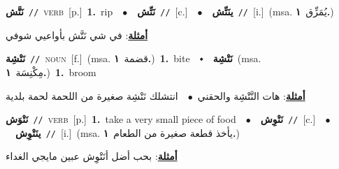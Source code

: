 \documentclass[10pt,a4paper,twoside]{article} %
\begin{document}
\begin{multicols}{2}
{\setlength\topsep{0pt}\textbf{\foreignlanguage{arabic}{نَتَّش}}\ {\color{gray}\texttt{//}\color{black}}\ \textsc{verb}\ [p.]\ \textbf{1.}~rip\ \ $\bullet$\ \ \setlength\topsep{0pt}\textbf{\foreignlanguage{arabic}{نَتِّش}}\ {\color{gray}\texttt{//}\color{black}}\ [c.]\ \ $\bullet$\ \ \setlength\topsep{0pt}\textbf{\foreignlanguage{arabic}{ينَتِّش}}\ {\color{gray}\texttt{//}\color{black}}\ [i.]\ \color{gray}(msa. \foreignlanguage{arabic}{يُمَزِّق}~\foreignlanguage{arabic}{\textbf{١.}})\color{black}\  \begin{flushright}\color{gray}\foreignlanguage{arabic}{\textbf{\underline{\foreignlanguage{arabic}{أمثلة}}}: في شي نَتَّش بأواعيي شوفي}\end{flushright}\color{black}} \vspace{2mm}

{\setlength\topsep{0pt}\textbf{\foreignlanguage{arabic}{نَتْشِة}}\ {\color{gray}\texttt{//}\color{black}}\ \textsc{noun}\ [f.]\ \color{gray}(msa. \foreignlanguage{arabic}{قضمة}~\foreignlanguage{arabic}{\textbf{١.}})\color{black}\ \textbf{1.}~bite\ \ $\smblkdiamond$\ \ \setlength\topsep{0pt}\textbf{\foreignlanguage{arabic}{نَتْشِة}}\ \color{gray}(msa. \foreignlanguage{arabic}{مِكْنِسَة}~\foreignlanguage{arabic}{\textbf{١.}})\color{black}\ \textbf{1.}~broom\  \begin{flushright}\color{gray}\foreignlanguage{arabic}{\textbf{\underline{\foreignlanguage{arabic}{أمثلة}}}: هات النَّتْشِة والحقني\ $\bullet$\ \  انتشلك نَتْشِة صغيرة من اللحمة لحمة بلدية}\end{flushright}\color{black}} \vspace{2mm}

{\setlength\topsep{0pt}\textbf{\foreignlanguage{arabic}{نَتْوَش}}\ {\color{gray}\texttt{//}\color{black}}\ \textsc{verb}\ [p.]\ \textbf{1.}~take a very small piece of food\ \ $\bullet$\ \ \setlength\topsep{0pt}\textbf{\foreignlanguage{arabic}{نَتْوِش}}\ {\color{gray}\texttt{//}\color{black}}\ [c.]\ \ $\bullet$\ \ \setlength\topsep{0pt}\textbf{\foreignlanguage{arabic}{ينَتْوِش}}\ {\color{gray}\texttt{//}\color{black}}\ [i.]\ \color{gray}(msa. \foreignlanguage{arabic}{يأخذ قطعة صغيرة من الطعام}~\foreignlanguage{arabic}{\textbf{١.}})\color{black}\  \begin{flushright}\color{gray}\foreignlanguage{arabic}{\textbf{\underline{\foreignlanguage{arabic}{أمثلة}}}: بحب أضل أنَتْوِش عبين مايجي الغداء}\end{flushright}\color{black}} \vspace{2mm}


\end{multicols}
\end{document}
